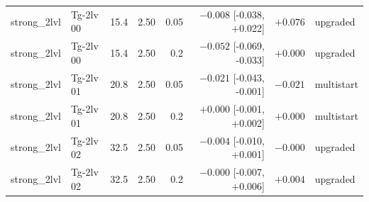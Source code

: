 \begin{longtable}{@{}llrrrrrl@{}}
strong\_2lvl & Tg-2lv 00 & 15.4 & 2.50 & 0.05 & $-0.008$ [-0.038, +0.022] & $+0.076$ & upgraded\\
strong\_2lvl & Tg-2lv 00 & 15.4 & 2.50 & 0.2 & $-0.052$ [-0.069, -0.033] & $+0.000$ & upgraded\\
strong\_2lvl & Tg-2lv 01 & 20.8 & 2.50 & 0.05 & $-0.021$ [-0.043, -0.001] & $-0.021$ & multistart\\
strong\_2lvl & Tg-2lv 01 & 20.8 & 2.50 & 0.2 & $+0.000$ [-0.001, +0.002] & $+0.000$ & multistart\\
strong\_2lvl & Tg-2lv 02 & 32.5 & 2.50 & 0.05 & $-0.004$ [-0.010, +0.001] & $-0.000$ & upgraded\\
strong\_2lvl & Tg-2lv 02 & 32.5 & 2.50 & 0.2 & $-0.000$ [-0.007, +0.006] & $+0.004$ & upgraded\\
\bottomrule
\end{longtable}